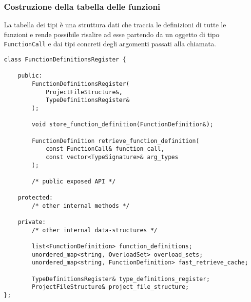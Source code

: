 \subsubsection{Costruzione della tabella delle funzioni}
La tabella dei tipi è una struttura dati che traccia le definizioni di tutte le funzioni
e rende possibile risalire ad esse partendo da un oggetto di tipo \texttt{FunctionCall} e dai 
tipi concreti degli argomenti passati alla chiamata. \\

\vspace{0.5cm}
\begin{lstlisting}[frame=single]
class FunctionDefinitionsRegister {

    public:
        FunctionDefinitionsRegister(
            ProjectFileStructure&,
            TypeDefinitionsRegister&
        );

        void store_function_definition(FunctionDefinition&);

        FunctionDefinition retrieve_function_definition(
            const FunctionCall& function_call, 
            const vector<TypeSignature>& arg_types
        );

        /* public exposed API */

    protected:
        /* other internal methods */

    private:
        /* other internal data-structures */

        list<FunctionDefinition> function_definitions;
        unordered_map<string, OverloadSet> overload_sets;
        unordered_map<string, FunctionDefinition> fast_retrieve_cache;
        
        TypeDefinitionsRegister& type_definitions_register;
        ProjectFileStructure& project_file_structure;
};
\end{lstlisting}
\vspace{0.5cm}